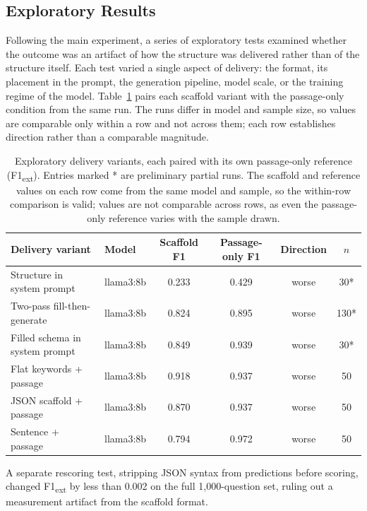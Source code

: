 \documentclass{article}
\begin{document}
\subsection{Exploratory Results}
\label{sec:exploratory}

Following the main experiment, a series of exploratory tests examined whether the outcome was an artifact of how the structure was delivered rather than of the structure itself. Each test varied a single aspect of delivery: the format, its placement in the prompt, the generation pipeline, model scale, or the training regime of the model. Table~\ref{tab:exploratory} pairs each scaffold variant with the passage-only condition from the same run. The runs differ in model and sample size, so values are comparable only within a row and not across them; each row establishes direction rather than a comparable magnitude.

\begin{table}[h]
\centering
\begin{tabular}{llcccc}
\toprule
Delivery variant & Model & Scaffold F1 & Passage-only F1 & Direction & $n$ \\
\midrule
Structure in system prompt      & llama3:8b   & 0.233 & 0.429 & worse         & 30* \\
Two-pass fill-then-generate      & llama3:8b   & 0.824 & 0.895 & worse         & 130* \\
Filled schema in system prompt   & llama3:8b   & 0.849 & 0.939 & worse         & 30* \\
Flat keywords + passage          & llama3:8b   & 0.918 & 0.937 & worse         & 50 \\
JSON scaffold + passage          & llama3:8b   & 0.870 & 0.937 & worse         & 50 \\
Sentence + passage               & llama3:8b   & 0.794 & 0.972 & worse         & 50 \\
\bottomrule
\end{tabular}
\caption{Exploratory delivery variants, each paired with its own passage-only reference (F1\textsubscript{ext}). Entries marked * are preliminary partial runs. The scaffold and reference values on each row come from the same model and sample, so the within-row comparison is valid; values are not comparable across rows, as even the passage-only reference varies with the sample drawn.}
\label{tab:exploratory}
\end{table}

A separate rescoring test, stripping JSON syntax from predictions before scoring, changed F1\textsubscript{ext} by less than 0.002 on the full 1,000-question set, ruling out a measurement artifact from the scaffold format.
\end{document}
